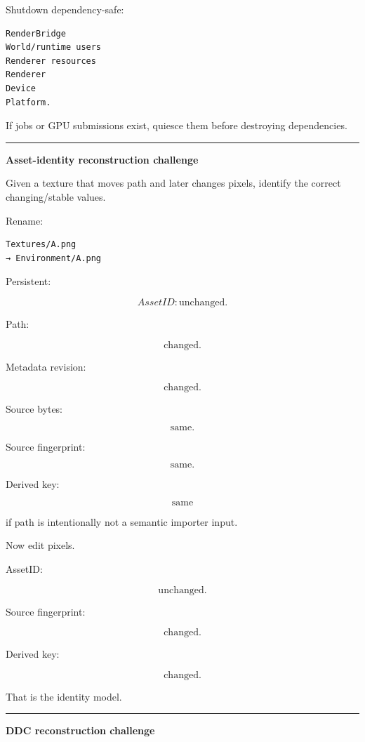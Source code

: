 Shutdown dependency-safe:

\begin{verbatim}
RenderBridge
World/runtime users
Renderer resources
Renderer
Device
Platform.
\end{verbatim}

If jobs or GPU submissions exist, quiesce them before destroying dependencies.

\begin{center}\rule{0.5\linewidth}{0.5pt}\end{center}

\textbf{Asset-identity reconstruction challenge}

Given a texture that moves path and later changes pixels, identify the correct changing/stable values.

Rename:

\begin{verbatim}
Textures/A.png
→ Environment/A.png
\end{verbatim}

Persistent:

\[
AssetID:
\text{unchanged}.
\]

Path:

\[
\text{changed}.
\]

Metadata revision:

\[
\text{changed}.
\]

Source bytes:

\[
\text{same}.
\]

Source fingerprint:

\[
\text{same}.
\]

Derived key:

\[
\text{same}
\]

if path is intentionally not a semantic importer input.

Now edit pixels.

AssetID:

\[
\text{unchanged}.
\]

Source fingerprint:

\[
\text{changed}.
\]

Derived key:

\[
\text{changed}.
\]

That is the identity model.

\begin{center}\rule{0.5\linewidth}{0.5pt}\end{center}

\textbf{DDC reconstruction challenge}

